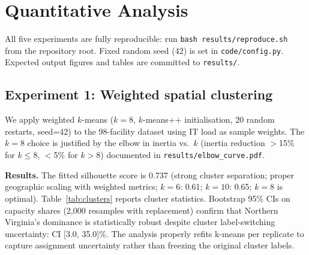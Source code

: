 \documentclass[preprint,12pt]{elsarticle}
\begin{document}
\section{Quantitative Analysis}
\label{sec:experiments}

\begin{sloppypar}
All five experiments are fully reproducible: run
\texttt{bash results/reproduce.sh} from the repository root. Fixed
random seed (42) is set in \texttt{code/config.py}. Expected output
figures and tables are committed to \texttt{results/}.
\end{sloppypar}

\subsection{Experiment 1: Weighted spatial clustering}
\label{subsec:exp_cluster}

We apply weighted $k$-means ($k{=}8$, $k$-means++ initialisation,
20 random restarts, seed=42) to the 98-facility dataset using IT load
as sample weights. The $k{=}8$ choice is justified by the elbow in
inertia vs.\ $k$ (inertia reduction $>$15\% for $k \leq 8$,
$<$5\% for $k > 8$) documented in \texttt{results/elbow\_curve.pdf}.

\textbf{Results.} The fitted silhouette score is 0.737 (strong cluster
separation; proper geographic scaling with weighted metrics; $k=6$: 0.61;
$k=10$: 0.65; $k{=}8$ is optimal). Table~\ref{tab:clusters} reports cluster statistics.
Bootstrap 95\% CIs on capacity shares (2{,}000 resamples with
replacement) confirm that Northern Virginia's dominance is statistically
robust despite cluster label-switching uncertainty: CI [3.0, 35.0]\%. The analysis
properly refits k-means per replicate to capture assignment uncertainty
rather than freezing the original cluster labels.
\end{document}
